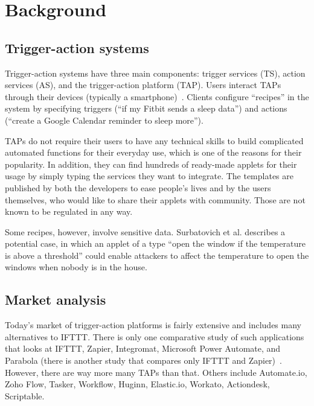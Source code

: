 \section{Background}
\label{sec:background}

\subsection{Trigger-action systems}

Trigger-action systems have three main components: trigger services
(TS), action services (AS), and the trigger-action platform (TAP). Users
interact TAPs through their devices (typically a
smartphone)~\cite{DBLP:conf/sp/ChenCWSCF21}. Clients configure ``recipes'' in
the system by specifying triggers (``if my Fitbit sends a sleep data'') and
actions (``create a Google Calendar reminder to sleep more''). 

TAPs do not require their users to have any technical skills to build
complicated automated functions for their everyday use, which is one of the
reasons for their popularity. In addition, they can find hundreds of ready-made
applets for their usage by simply typing the services they want to
integrate. The templates are published by both the developers to ease people's
lives and by the users themselves, who would like to share their applets with
community. Those are not known to be regulated in any way.

Some recipes, however, involve sensitive data. Surbatovich et al.
describes a potential case, in which an applet of a type ``open the window if
the temperature is above a threshold'' could enable attackers to affect the
temperature to open the windows when nobody is in the house.


\subsection{Market analysis}
Today's market of trigger-action platforms is fairly extensive and includes many
alternatives to IFTTT.  There is only one comparative study of such applications
that looks at IFTTT, Zapier, Integromat, Microsoft Power Automate, and Parabola
(there is another study that compares only IFTTT and
Zapier)~\cite{DBLP:conf/icict2/AbdouEF21}. However, there are way more many TAPs
than that. Others include Automate.io, Zoho Flow, Tasker, Workflow, Huginn,
Elastic.io, Workato, Actiondesk, Scriptable.

